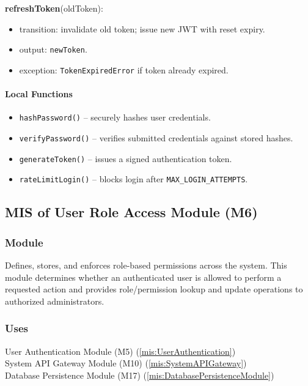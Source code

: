 \documentclass[12pt, titlepage]{article}
\begin{document}
\noindent \textbf{refreshToken}(oldToken):
\begin{itemize}
  \item transition: invalidate old token; issue new JWT with reset expiry.
  \item output: \texttt{newToken}.
  \item exception: \texttt{TokenExpiredError} if token already expired.
\end{itemize}

\paragraph{Local Functions}
\begin{itemize}
  \item \texttt{hashPassword()} – securely hashes user credentials.
  \item \texttt{verifyPassword()} – verifies submitted credentials against stored hashes.
  \item \texttt{generateToken()} – issues a signed authentication token.
  \item \texttt{rateLimitLogin()} – blocks login after \texttt{MAX\_LOGIN\_ATTEMPTS}.
\end{itemize}


\subsection{MIS of User Role Access Module (M6)}
\label{mis:UserRoleAccess}

\subsubsection{Module}
Defines, stores, and enforces role-based permissions across the system.
This module determines whether an authenticated user is allowed to perform a
requested action and provides role/permission lookup and update operations to
authorized administrators.

\subsubsection{Uses}
User Authentication Module (M5) (\ref{mis:UserAuthentication})\\
System API Gateway Module (M10) (\ref{mis:SystemAPIGateway})\\
Database Persistence Module (M17) (\ref{mis:DatabasePersistenceModule})\\
\end{document}
